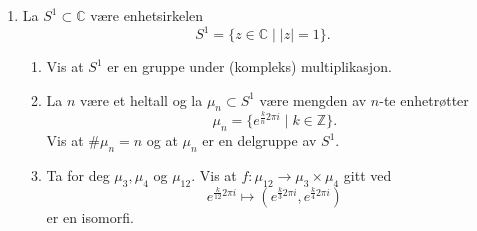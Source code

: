 \begin{enumerate}[resume]
    \item La $S^1\subset \mathbb C$ være enhetsirkelen
        \[
            S^1 = \{ z\in \mathbb C\mid |z| = 1\}.
        \]
        \begin{enumerate}
            \item Vis at $S^1$ er en gruppe under (kompleks) multiplikasjon.
            \item La $n$ være et heltall og la $\mu_n\subset S^1$ være mengden av $n$-te
                enhetrøtter
                \[
                    \mu_n = \{
                        e^{\frac k n 2\pi i}
                        \mid k\in \mathbb Z
                    \}.
                \]
                Vis at $\# \mu_n = n$ og at $\mu_n$ er en delgruppe av $S^1$.
            \item Ta for deg $\mu_3, \mu_4$ og $\mu_{12}$.
                Vis at $f\colon \mu_{12}\to \mu_3\times \mu_4$
                gitt ved
                \[
                    e^{\frac k {12} 2\pi i}
                    \mapsto (e^{\frac k 3 2\pi i}, e^{\frac k 4 2\pi i})
                \]
                er en isomorfi.


\end{enumerate}
\end{enumerate}
